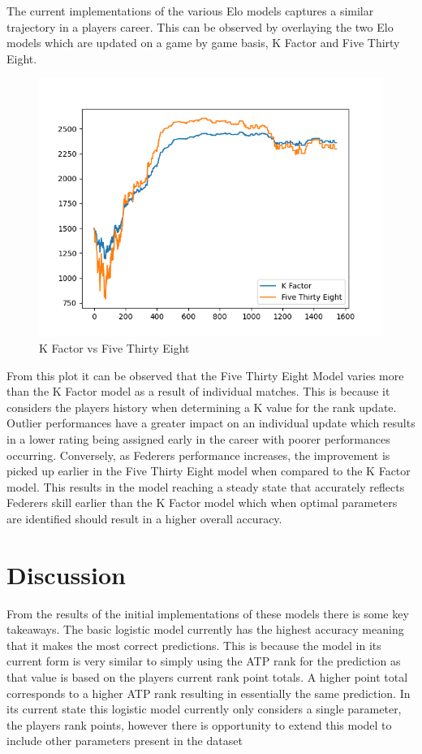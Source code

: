 \documentclass[12pt,a4paper]{article}
\begin{document}
The current implementations of the various Elo models captures a similar trajectory in a
players career. This can be observed by overlaying the two Elo models which are updated
on a game by game basis, K Factor and Five Thirty Eight.
\begin{figure}[H]
  \includegraphics[scale=0.8]{images/federer_comparison.png}
  \caption{K Factor vs Five Thirty Eight}
  \label{fig:federer-k-538}
\end{figure}

From this plot it can be observed that the Five Thirty Eight Model varies more than the
K Factor model as a result of individual matches. This is because it considers the players
history when determining a K value for the rank update. Outlier performances have a greater
impact on an individual update which results in a lower rating being assigned early in the
career with poorer performances occurring. Conversely, as Federers performance increases,
the improvement is picked up earlier in the Five Thirty Eight model when compared to the
K Factor model. This results in the model reaching a steady state that accurately reflects
Federers skill earlier than the K Factor model which when optimal parameters are identified
should result in a higher overall accuracy.

\vspace{10mm}
\noindent \hrulefill

\clearpage
\section{Discussion}
From the results of the initial implementations of these models there is some key
takeaways. The basic logistic model currently has the highest accuracy meaning that it
makes the most correct predictions. This is because the model in its current form is very
similar to simply using the ATP rank for the prediction as that value is based on the players
current rank point totals. A higher point total corresponds to a higher ATP rank resulting
in essentially the same prediction. In its current state this logistic model currently only
considers a single parameter, the players rank points, however there is opportunity to
extend this model to include other parameters present in the dataset
\end{document}
